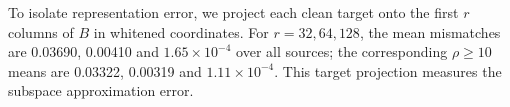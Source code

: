 \documentclass[10pt,prd,aps,a4paper,twocolumn,superscriptaddress,nofootinbib,floatfix]{revtex4-2}
\begin{document}
To isolate representation error, we project each clean target onto the first $r$ columns of $B$ in whitened coordinates. For $r=32,64,128$, the mean mismatches are 0.03690, 0.00410 and $1.65\times10^{-4}$ over all sources; the corresponding $\rho\ge10$ means are 0.03322, 0.00319 and $1.11\times10^{-4}$. This target projection measures the subspace approximation error.


\clearpage

\end{document}

